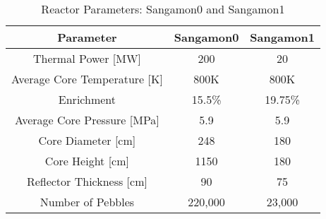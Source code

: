 \begin{table}[h!]
\centering
\begin{tabular}{|| c || c | c |}
\hline
Parameter & Sangamon0 & Sangamon1 \\
\hline \hline
Thermal Power [MW] & 200 & 20 \\
Average Core Temperature [K] & 800K & 800K \\
Enrichment & 15.5\% & 19.75\% \\
Average Core Pressure [MPa] & 5.9 & 5.9 \\
Core Diameter [cm] & 248 & 180 \\
Core Height [cm] & 1150 & 180 \\
Reflector Thickness [cm] & 90 & 75 \\
Number of Pebbles & 220,000 & 23,000 \\
\hline
\end{tabular}
\caption{Reactor Parameters: Sangamon0 and Sangamon1}
\label{table:params1}
\end{table}